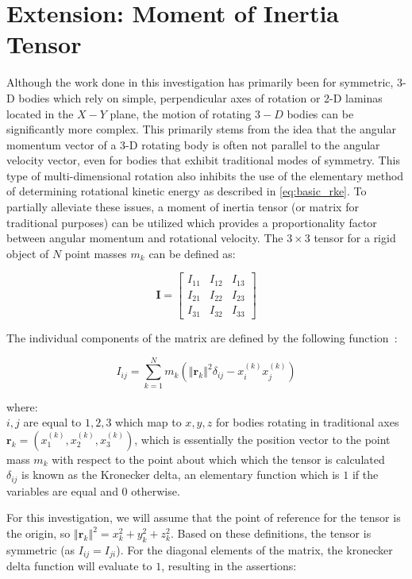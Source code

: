 \section{Extension: Moment of Inertia Tensor}

Although the work done in this investigation has primarily been for symmetric, 3-D bodies which rely on simple, perpendicular axes of rotation or 2-D laminas located in the $X-Y$ plane, the motion of rotating $3-D$ bodies can be significantly more complex. This primarily stems from the idea that the angular momentum vector of a 3-D rotating body is often not parallel to the angular velocity vector, even for bodies that exhibit traditional modes of symmetry. This type of multi-dimensional rotation also inhibits the use of the elementary method of determining rotational kinetic energy as described in \cref{eq:basic_rke}. To partially alleviate these issues, a moment of inertia tensor (or matrix for traditional purposes) can be utilized which provides a proportionality factor between angular momentum and rotational velocity. The $3 \times 3$ tensor for a rigid object of $N$ point masses $m_k$ can be defined as:

\[\bm{I} = \begin{bmatrix}I_{11} & I_{12} & I_{13} \\ I_{21} & I_{22} & I_{23} \\ I_{31} & I_{32} & I_{33}\end{bmatrix}\]

The individual components of the matrix are defined by the following function~\parencite{Thornton_Marion_2004}:

\[I_{ij} = \sum_{k=1}^N m_k (\left\Vert \bm{r}_k \right\Vert^2\delta_{ij} - x_i^{(k)}x_j^{(k)})\]

where: \\

$i, j$ are equal to $1, 2, 3$ which map to $x, y, z$ for bodies rotating in traditional axes \\
$\bm{r}_k = (x_1^{(k)}, x_2^{(k)}, x_3^{(k)})$, which is essentially the position vector to the point mass $m_k$ with respect to the point about which which the tensor is calculated \\
$\delta_{ij}$ is known as the Kronecker delta, an elementary function which is $1$ if the variables are equal and $0$ otherwise.

For this investigation, we will assume that the point of reference for the tensor is the origin, so $\left\Vert \bm{r}_k \right\Vert^2 = x_k^2 + y_k^2 + z_k^2$. Based on these definitions, the tensor is symmetric (as $I_{ij} = I_{ji}$). For the diagonal elements of the matrix, the kronecker delta function will evaluate to $1$, resulting in the assertions:

